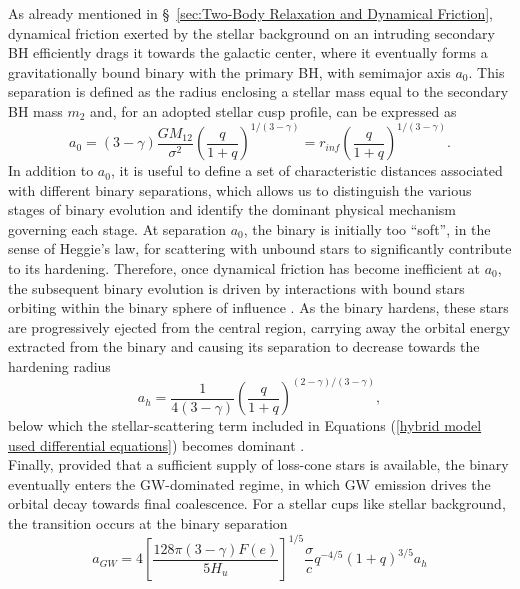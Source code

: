 \documentclass[12pt,twoside,openany]{book}
\begin{document}
As already mentioned in \S~\ref{sec:Two-Body Relaxation and Dynamical Friction}, dynamical friction exerted by the stellar background on an intruding secondary BH efficiently drags it towards the galactic center, where it eventually forms a gravitationally bound binary with the primary BH, with semimajor axis $a_0$. This separation is defined as the radius enclosing a stellar mass equal to the secondary BH mass $m_2$ and, for an adopted stellar cusp profile, can be expressed as
\begin{equation}\label{Sesana_2010 a_0}
a_0=(3-\gamma)\frac{GM_{12}}{\sigma^2}\left(\frac{q}{1+q}\right)^{1/(3-\gamma)}=r_{inf}\left(\frac{q}{1+q}\right)^{1/(3-\gamma)}.
\end{equation}
In addition to $a_0$, it is useful to define a set of characteristic distances associated with different binary separations, which allows us to distinguish the various stages of binary evolution and identify the dominant physical mechanism governing each stage. At separation $a_0$, the binary is initially too “soft”, in the sense of Heggie's law, for scattering with unbound stars to significantly contribute to its hardening. Therefore, once dynamical friction has become inefficient at $a_0$, the subsequent binary evolution is driven by interactions with bound stars orbiting within the binary sphere of influence \parencite{Sesana_2008}. As the binary hardens, these stars are progressively ejected from the central region, carrying away the orbital energy extracted from the binary and causing its separation to decrease towards the hardening radius
\begin{equation}
a_h=\frac{1}{4(3-\gamma)}\left(\frac{q}{1+q}\right)^{(2-\gamma)/(3-\gamma)},
\label{hardening radius sec 2.2}
\end{equation}
below which the stellar-scattering term included in Equations (\ref{hybrid model used differential equations}) becomes dominant \parencite{Sesana_2010}.\\Finally, provided that a sufficient supply of loss-cone stars is available, the binary eventually enters the GW-dominated regime, in which GW emission drives the orbital decay towards final coalescence. For a stellar cups like stellar background, the transition occurs at the binary separation
\begin{equation}
\label{cusp a_GW}
a_{GW}=4\left[\frac{128\pi(3-\gamma) F(e)}{5H_u}\right]^{1/5}\frac{\sigma}{c}q^{-4/5}(1+q)^{3/5}a_h
\end{equation}
\end{document}
